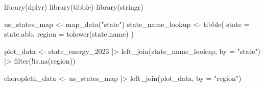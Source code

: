 \documentclass[
  letterpaper,
  DIV=11,
  numbers=noendperiod]{scrartcl}
\newenvironment{Shaded}{\begin{snugshade}}{\end{snugshade}}
\newcommand{\AttributeTok}[1]{\textcolor[rgb]{0.40,0.45,0.13}{#1}}
\newcommand{\FunctionTok}[1]{\textcolor[rgb]{0.28,0.35,0.67}{#1}}
\newcommand{\NormalTok}[1]{\textcolor[rgb]{0.00,0.23,0.31}{#1}}
\newcommand{\OtherTok}[1]{\textcolor[rgb]{0.00,0.23,0.31}{#1}}
\newcommand{\SpecialCharTok}[1]{\textcolor[rgb]{0.37,0.37,0.37}{#1}}
\newcommand{\StringTok}[1]{\textcolor[rgb]{0.13,0.47,0.30}{#1}}
\begin{document}
\begin{Shaded}
\begin{Highlighting}[]
\FunctionTok{library}\NormalTok{(dplyr)}
\FunctionTok{library}\NormalTok{(tibble)}
\FunctionTok{library}\NormalTok{(stringr)}

\NormalTok{us\_states\_map }\OtherTok{\textless{}{-}} \FunctionTok{map\_data}\NormalTok{(}\StringTok{"state"}\NormalTok{)}
\NormalTok{state\_name\_lookup }\OtherTok{\textless{}{-}} \FunctionTok{tibble}\NormalTok{(}
  \AttributeTok{state =}\NormalTok{ state.abb,}
  \AttributeTok{region =} \FunctionTok{tolower}\NormalTok{(state.name)}
\NormalTok{)}

\NormalTok{plot\_data }\OtherTok{\textless{}{-}}
\NormalTok{  state\_energy\_2023 }\SpecialCharTok{|\textgreater{}}
  \FunctionTok{left\_join}\NormalTok{(state\_name\_lookup, }\AttributeTok{by =} \StringTok{"state"}\NormalTok{) }\SpecialCharTok{|\textgreater{}}
  \FunctionTok{filter}\NormalTok{(}\SpecialCharTok{!}\FunctionTok{is.na}\NormalTok{(region))}

\NormalTok{choropleth\_data }\OtherTok{\textless{}{-}}
\NormalTok{  us\_states\_map }\SpecialCharTok{|\textgreater{}}
  \FunctionTok{left\_join}\NormalTok{(plot\_data, }\AttributeTok{by =} \StringTok{"region"}\NormalTok{)}


\end{Highlighting}
\end{Shaded}
\end{document}
